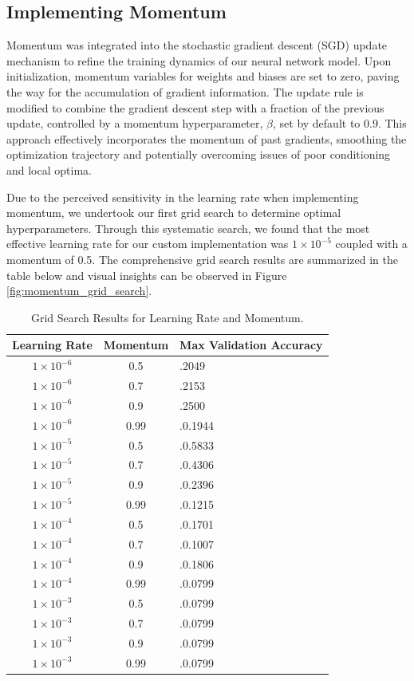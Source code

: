 \documentclass[letterpaper]{article}
\begin{document}
\subsection{Implementing Momentum}
\label{subsec:momentum}
Momentum was integrated into the stochastic gradient descent (SGD) update mechanism to refine the training dynamics of our neural network model. Upon initialization, momentum variables for weights and biases are set to zero, paving the way for the accumulation of gradient information. The update rule is modified to combine the gradient descent step with a fraction of the previous update, controlled by a momentum hyperparameter, $ \beta $, set by default to 0.9. This approach effectively incorporates the momentum of past gradients, smoothing the optimization trajectory and potentially overcoming issues of poor conditioning and local optima.

Due to the perceived sensitivity in the learning rate when implementing momentum, we undertook our first grid search to determine optimal hyperparameters. Through this systematic search, we found that the most effective learning rate for our custom implementation was $1 \times 10^{-5}$ coupled with a momentum of 0.5. The comprehensive grid search results are summarized in the table below and visual insights can be observed in Figure \ref{fig:momentum_grid_search}.

\begin{table}[h]
    \centering
    \small %
    \begin{tabularx}{\columnwidth}{|c|c|X|}
    \hline
    Learning Rate & Momentum & Max Validation Accuracy \\
    \hline
    $1 \times 10^{-6}$ & 0.5 & .2049 \\
    $1 \times 10^{-6}$ & 0.7 & .2153 \\
    $1 \times 10^{-6}$ & 0.9 & .2500 \\
    $1 \times 10^{-6}$ & 0.99 & .0.1944 \\
    $1 \times 10^{-5}$ & 0.5 & .0.5833 \\
    $1 \times 10^{-5}$ & 0.7 & .0.4306 \\
    $1 \times 10^{-5}$ & 0.9 & .0.2396 \\
    $1 \times 10^{-5}$ & 0.99 & .0.1215 \\
    $1 \times 10^{-4}$ & 0.5 & .0.1701 \\
    $1 \times 10^{-4}$ & 0.7 & .0.1007 \\
    $1 \times 10^{-4}$ & 0.9 & .0.1806 \\
    $1 \times 10^{-4}$ & 0.99 & .0.0799 \\
    $1 \times 10^{-3}$ & 0.5 & .0.0799 \\
    $1 \times 10^{-3}$ & 0.7 & .0.0799 \\
    $1 \times 10^{-3}$ & 0.9 & .0.0799 \\
    $1 \times 10^{-3}$ & 0.99 & .0.0799 \\
    \hline
    \end{tabularx}
    \caption{Grid Search Results for Learning Rate and Momentum.}
    \label{table:grid_search}
    \end{table}
    
\end{document}
